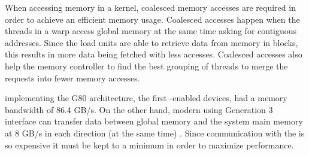 \documentclass[../thesis]{subfiles}
\begin{document}
	When accessing memory in a \cuda kernel, coalesced memory accesses are required in order to achieve an efficient memory usage. Coalesced accesses happen when the threads in a warp access global memory at the same time asking for contiguous addresses. Since the load units are able to retrieve data from memory in blocks, this results in more data being fetched with less accesses. Coalesced accesses also help the memory controller to find the best grouping of threads to merge the requests into fewer memory accesses.

	\gpus implementing the G80 architecture, the first \cuda-enabled devices, had a memory bandwidth of 86.4 GB/s. On the other hand, modern \gpus using \pcie Generation 3 interface can transfer data between global memory and the system main memory at 8 GB/s in each direction (at the same time) \cite{PMPP:2012}. Since communication with the \cpu is so expensive it must be kept to a minimum in order to maximize performance.

	
\end{document}
